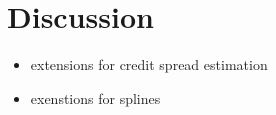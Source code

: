 \newpage
\section{Discussion}

\begin{itemize}
\item extensions for credit spread estimation \cite{Jankowitsch2004, Geyer2004}
\item exenstions for splines \cite{Vasicek1982, Fisher1995}
\end{itemize}
